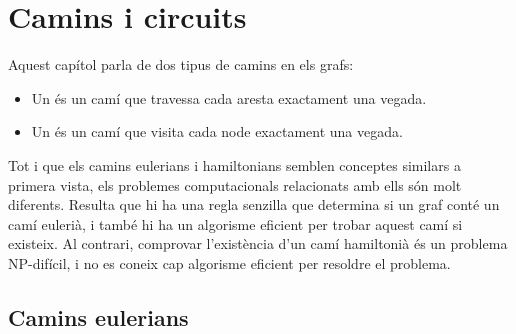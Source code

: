 \chapter{Camins i circuits}

Aquest capítol parla de dos tipus de camins en els grafs:
\begin{itemize}
\item Un  és un camí que
travessa cada aresta exactament una vegada.
\item Un  és un camí
que visita cada node exactament una vegada.
\end{itemize}


Tot i que els camins eulerians i hamiltonians semblen conceptes
similars a primera vista, els problemes computacionals relacionats amb
ells són molt diferents. Resulta que hi ha una regla senzilla que
determina si un graf conté un camí eulerià, i també hi ha un algorisme
eficient per trobar aquest camí si existeix. Al contrari, comprovar
l'existència d'un camí hamiltonià és un problema NP-difícil, i no es
coneix cap algorisme eficient per resoldre el problema.

\section{Camins eulerians}


